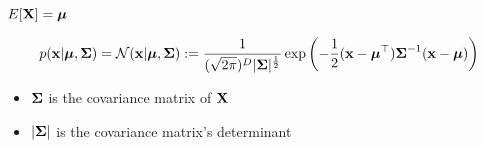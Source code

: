 \begin{remark}
\(E[\boldsymbol{\mathrm{X}}] = \boldsymbol{\mathrm{\mu}}\)
\end{remark}

\begin{definition}
\[
p(\boldsymbol{\mathrm{x}}|\boldsymbol{\mathrm{\mu}}, \boldsymbol{\mathrm{\Sigma}}) = \mathcal{N}(\boldsymbol{\mathrm{x}}|\boldsymbol{\mathrm{\mu}}, \boldsymbol{\mathrm{\Sigma}}) :=
\frac{1}{(\sqrt{2\pi})^D |\boldsymbol{\mathrm{\Sigma}}|^\frac{1}{2}} \exp \left( -\frac{1}{2}(\boldsymbol{\mathrm{x}} - \boldsymbol{\mathrm{\mu}}^\top) \boldsymbol{\mathrm{\Sigma}}^{-1} (\boldsymbol{\mathrm{x}} - \boldsymbol{\mathrm{\mu}}) \right)
\]

\begin{itemize}
\item \(\boldsymbol{\mathrm{\Sigma}}\) is the covariance matrix of \(\boldsymbol{\mathrm{X}}\)
\item \(|\boldsymbol{\mathrm{\Sigma}}|\) is the covariance matrix's determinant
\end{itemize}
\end{definition}

